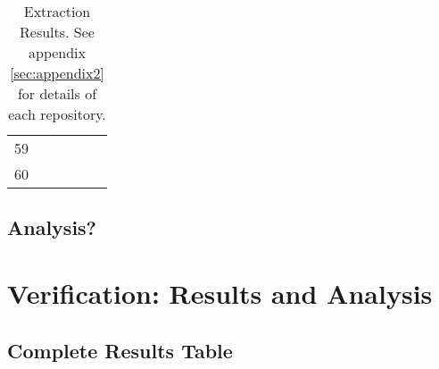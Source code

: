 \begin{table}[ht]
\begin{tabular}{c|lllll}
    59                       &                                          &                                           &                                                &                                    &                                      \\
    60                       &                                          &                                           &                                                &                                    &                                      \\ \hline
    \end{tabular}
    \caption{Extraction Results. See appendix \ref{sec:appendix2} for details of each repository.}
    \label{tab:extraction_results}
\end{table}

\subsection{Analysis?}

\section{Verification: Results and Analysis}
\label{sec:verification_results_analysis}

\subsection{Complete Results Table}
\label{subsec:verification_results_table}
\newpage

